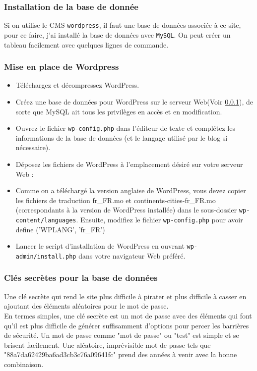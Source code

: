      \subsubsection{Installation de la base de donnée}
     \label{database}
Si on utilise le CMS \texttt{wordpress}, il faut une base de données associée à ce site, pour ce faire, j'ai installé la base de données avec \texttt{MySQL}. On peut créer un tableau facilement avec quelques lignes de commande.

     \subsubsection{Mise en place de Wordpress}
\begin{itemize}
\item[Étape 1:]Téléchargez et décompressez WordPress.
\item[Étape 2:]Créez une base de données pour WordPress sur le serveur Web(Voir \ref{database}), de sorte que MySQL ait tous les privilèges en accès et en modification.
\item[Étape 3:]Ouvrez le fichier \texttt{wp-config.php} dans l'éditeur de texte et complétez les informations de la base de données (et le langage utilisé par le blog si nécessaire).
\item[Étape 4:]Déposez les fichiers de WordPress à l'emplacement désiré sur votre serveur Web :
\item[Étape 5:]Comme on a téléchargé la version anglaise de WordPress, vous devez copier les fichiers de traduction fr\_FR.mo et continents-cities-fr\_FR.mo (correspondants à la version de WordPress installée) dans le sous-dossier \texttt{wp-content/languages}. Ensuite, modifiez le fichier \texttt{wp-config.php} pour avoir define ('WPLANG', 'fr\_FR')
\item[Étape 6:]Lancer le script d'installation de WordPress en ouvrant \texttt{wp-admin/install.php} dans votre navigateur Web préféré.
\end{itemize}    
 
     \subsubsection{Clés secrètes pour la base de données}    
Une clé secrète qui rend le site plus difficile à pirater et plus difficile à casser en ajoutant des éléments aléatoires pour le mot de passe.\\

En termes simples, une clé secrète est un mot de passe avec des éléments qui font qu'il est plus difficile de générer suffisamment d'options pour percer les barrières de sécurité. Un mot de passe comme "mot de passe" ou "test" est simple et se brisent facilement. Une aléatoire, imprévisible mot de passe tels que "88a7da62429ba6ad3cb3c76a09641fc" prend des années à venir avec la bonne combinaison.\\

